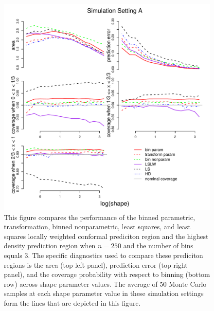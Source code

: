 \documentclass[11pt]{article}\usepackage[]{graphicx}\usepackage[]{color}
\makeatletter
\def\maxwidth{ %
  \ifdim\Gin@nat@width>\linewidth
    \linewidth
  \else
    \Gin@nat@width
  \fi
}
\newenvironment{knitrout}{}{} %
\makeatother
\begin{document}
\newpage
\begin{figure}[h!]
\begin{center}
\begin{knitrout}
\color{fgcolor}
\includegraphics[width=\maxwidth]{figure/Fig-gamma-250-1} 

\end{knitrout}
\end{center}
\caption{This figure compares the performance of the 
  binned parametric,
  transformation,
  binned nonparametric,
  least squares, and 
  least squares locally weighted conformal prediciton region and the 
  highest density prediction region when $n = 250$ and the number of bins 
  equals 3.  
  The specific diagnostics used to compare these prediciton regions is the 
    area (top-left panel),
    prediction error (top-right panel), and
    the coverage probability with respect to binning (bottom row) 
    across shape parameter values.
  The average of 50 Monte Carlo samples at each shape parameter value in 
  these simulation settings form the lines that are depicted in this figure.}
\label{Fig:gamma.250}
\end{figure}
\end{document}
